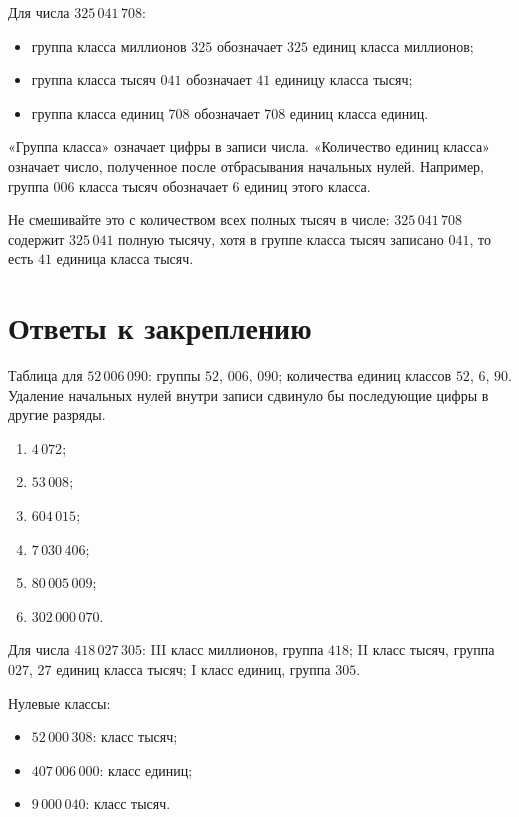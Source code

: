 Для числа \(325\,041\,708\):
\begin{itemize}
  \item группа класса миллионов \(325\) обозначает \(325\) единиц класса
    миллионов;
  \item группа класса тысяч \(041\) обозначает \(41\) единицу класса тысяч;
  \item группа класса единиц \(708\) обозначает \(708\) единиц класса единиц.
\end{itemize}

\begin{teacherbox}
  «Группа класса» означает цифры в записи числа. «Количество единиц класса»
  означает число, полученное после отбрасывания начальных нулей. Например,
  группа \(006\) класса тысяч обозначает \(6\) единиц этого класса.

  Не смешивайте это с количеством всех полных тысяч в числе:
  \(325\,041\,708\) содержит \(325\,041\) полную тысячу, хотя в группе класса
  тысяч записано \(041\), то есть \(41\) единица класса тысяч.
\end{teacherbox}

\newpage
\section{Ответы к закреплению}

Таблица для \(52\,006\,090\): группы \(52\), \(006\), \(090\); количества
единиц классов \(52\), \(6\), \(90\). Удаление начальных нулей внутри записи
сдвинуло бы последующие цифры в другие разряды.

\begin{teacherbox}
  \begin{enumerate}
    \item \(4\,072\);
    \item \(53\,008\);
    \item \(604\,015\);
    \item \(7\,030\,406\);
    \item \(80\,005\,009\);
    \item \(302\,000\,070\).
  \end{enumerate}
\end{teacherbox}

Для числа \(418\,027\,305\): III класс миллионов, группа \(418\); II класс
тысяч, группа \(027\), \(27\) единиц класса тысяч; I класс единиц, группа
\(305\).

Нулевые классы:
\begin{itemize}
  \item \(52\,000\,308\): класс тысяч;
  \item \(407\,006\,000\): класс единиц;
  \item \(9\,000\,040\): класс тысяч.
\end{itemize}

